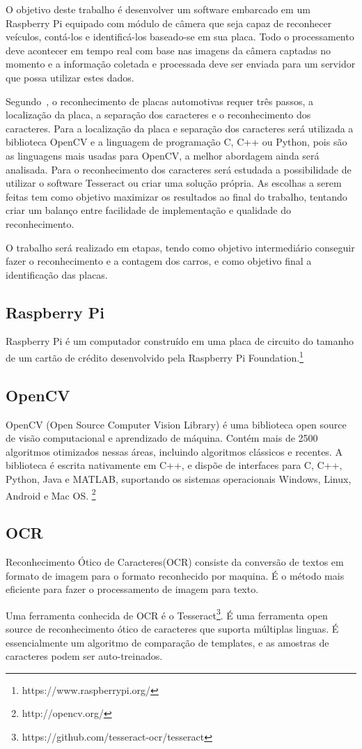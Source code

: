 
O objetivo deste trabalho é desenvolver um software embarcado em um Raspberry Pi
equipado com módulo de câmera que seja capaz de reconhecer veículos, contá-los e
identificá-los baseado-se em sua placa. Todo o processamento deve acontecer em
tempo real com base nas imagens da câmera captadas no momento e a informação
coletada e processada deve ser enviada para um servidor que possa utilizar estes
dados.

Segundo~\cite{ahmad2015automatic}, o reconhecimento de placas automotivas requer
três passos, a localização da placa, a separação dos caracteres e o
reconhecimento dos caracteres. Para a localização da placa e separação dos
caracteres será utilizada a biblioteca OpenCV e a linguagem de programação C,
C++ ou Python, pois são as linguagens mais usadas para OpenCV, a melhor
abordagem ainda será analisada. Para o reconhecimento dos caracteres será
estudada a possibilidade de utilizar o software Tesseract ou criar uma solução
própria. As escolhas a serem feitas tem como objetivo maximizar os resultados ao
final do trabalho, tentando criar um balanço entre facilidade de implementação e
qualidade do reconhecimento.

O trabalho será realizado em etapas, tendo como objetivo intermediário conseguir 
fazer o reconhecimento e a contagem dos carros, e como objetivo final a identificação
das placas.

\subsection{Raspberry Pi}

Raspberry Pi é um computador construído em uma placa de circuito do tamanho de um cartão 
de crédito desenvolvido pela Raspberry Pi Foundation.\footnote{https://www.raspberrypi.org/}

\subsection{OpenCV}

OpenCV (Open Source Computer Vision Library) é uma biblioteca open source de visão 
computacional e aprendizado de máquina. Contém mais de 2500 algoritmos otimizados nessas
áreas, incluindo algoritmos clássicos e recentes. A biblioteca é escrita nativamente
em C++, e dispõe de interfaces para C, C++, Python, Java e MATLAB, suportando os sistemas 
operacionais Windows, Linux, Android e Mac OS. \footnote{http://opencv.org/}

\subsection{OCR}

Reconhecimento Ótico de Caracteres(OCR) consiste da conversão de textos em formato de imagem para
o formato reconhecido por maquina. É o método mais eficiente para fazer o processamento
de imagem para texto.~\cite{mohit2015designing}

Uma ferramenta conhecida de OCR é o Tesseract\footnote{https://github.com/tesseract-ocr/tesseract}.
É uma ferramenta open source de reconhecimento ótico de caracteres que suporta múltiplas
linguas. É essencialmente um algoritmo de comparação de templates, e as amostras de caracteres podem
ser auto-treinados.~\cite{ho2016intelligent}

